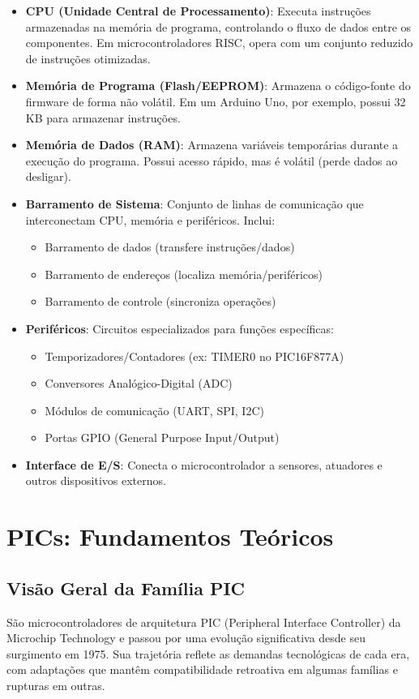 \documentclass[12pt,a4paper]{book}
\begin{document}
\begin{itemize}
\item \textbf{CPU (Unidade Central de Processamento)}: Executa instruções armazenadas na memória de programa, controlando o fluxo de dados entre os componentes. Em microcontroladores RISC, opera com um conjunto reduzido de instruções otimizadas.

\item \textbf{Memória de Programa (Flash/EEPROM)}: Armazena o código-fonte do firmware de forma não volátil. Em um Arduino Uno, por exemplo, possui 32 KB para armazenar instruções.

\item \textbf{Memória de Dados (RAM)}: Armazena variáveis temporárias durante a execução do programa. Possui acesso rápido, mas é volátil (perde dados ao desligar).

\item \textbf{Barramento de Sistema}: Conjunto de linhas de comunicação que interconectam CPU, memória e periféricos. Inclui:
\begin{itemize}
\item Barramento de dados (transfere instruções/dados)
\item Barramento de endereços (localiza memória/periféricos)
\item Barramento de controle (sincroniza operações)
\end{itemize}

\item \textbf{Periféricos}: Circuitos especializados para funções específicas:
\begin{itemize}
\item Temporizadores/Contadores (ex: TIMER0 no PIC16F877A)
\item Conversores Analógico-Digital (ADC)
\item Módulos de comunicação (UART, SPI, I2C)
\item Portas GPIO (General Purpose Input/Output)
\end{itemize}
\item \textbf{Interface de E/S}: Conecta o microcontrolador a sensores, atuadores e outros dispositivos externos.
\end{itemize}
\chapter{PICs: Fundamentos Teóricos}
\section{Visão Geral da Família PIC}
São microcontroladores de arquitetura PIC (Peripheral Interface Controller) da Microchip Technology e passou por uma evolução significativa desde seu surgimento em 1975. Sua trajetória reflete as demandas tecnológicas de cada era, com adaptações que mantêm compatibilidade retroativa em algumas famílias e rupturas em outras.
\end{document}
